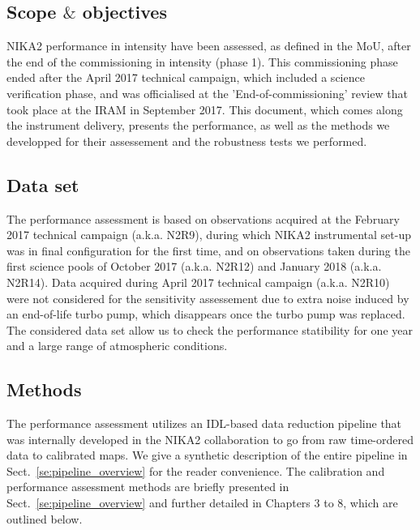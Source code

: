 
\subsection*{Scope $\&$ objectives}
NIKA2 performance in intensity have been assessed, as defined in the
MoU, after the end of the commissioning in intensity (phase 1). This
commissioning phase ended after the April 2017 technical campaign,
which included a science verification phase, and was officialised at
the 'End-of-commissioning' review that took place at the IRAM in September
2017. This document, which comes along the instrument delivery,
presents the performance, as well as the methods we developped
for their assessement and the robustness tests we performed.

\subsection*{Data set}
The performance assessment is based on observations acquired at
the February 2017 technical campaign (a.k.a. N2R9), during which NIKA2
instrumental set-up was in final configuration for the first time, and
on observations taken during the first science pools of October 2017
(a.k.a. N2R12) and January 2018 (a.k.a. N2R14). Data acquired during
April 2017 technical campaign (a.k.a. N2R10) were not considered for
the sensitivity assessement due to extra noise induced by an
end-of-life turbo pump, which disappears once the turbo pump was
replaced. The considered data set allow us to check the performance
statibility for one year and a large range of atmospheric conditions. 

\subsection*{Methods}
The performance assessment utilizes an IDL-based data reduction
pipeline that was internally developed in the NIKA2 collaboration
to go from raw time-ordered data to calibrated maps. We give a
synthetic description of the entire pipeline in
Sect.~\ref{se:pipeline_overview} for the reader convenience. The
calibration and performance assessment methods are briefly presented
in Sect.~\ref{se:pipeline_overview} and further detailed in Chapters 3
to 8, which are outlined below.


